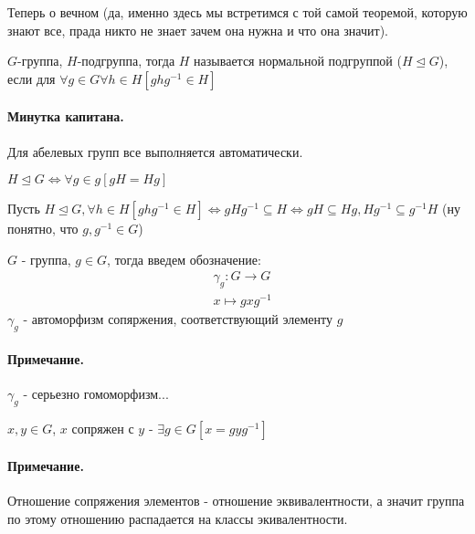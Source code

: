 Теперь о вечном (да, именно здесь мы встретимся с той самой теоремой, которую знают все, прада никто не знает зачем она нужна и что она значит).

\begin{Def}
$G$-группа, $H$-подгруппа, тогда $H$ называется нормальной подгруппой ($H \trianglelefteq G$), если для $\forall g \in G \forall h \in H \left[g h g^{-1} \in H \right]$
\end{Def}

\paragraph{Минутка капитана.} Для абелевых групп все выполняется автоматически.

\begin{Th}
$H \trianglelefteq G \Leftrightarrow \forall g \in g \left[gH = Hg\right]$
\end{Th}
\begin{Proof}
Пусть $H \trianglelefteq G, \forall h \in H \left[ghg^{-1}\in H\right] \Leftrightarrow gHg^{-1} \subseteq H \Leftrightarrow gH \subseteq Hg, Hg^{-1} \subseteq g^{-1}H$ (ну понятно, что $g, g^{-1} \in G$)
\end{Proof}

\begin{Def}
$G$ - группа, $g \in G$, тогда введем обозначение:
\[
\begin{split}
	& \gamma_g : G \rightarrow G \\
	& x \mapsto gxg^{-1}
\end{split}
\]
$\gamma_g$ - автоморфизм сопяржения, соответствующий элементу $g$
\end{Def}

\paragraph{Примечание.} $\gamma_g$ - серьезно гомоморфизм...

\begin{Def}
$x,y \in G$, $x$ сопряжен с $y$ - $\exists g \in G \left[x = gyg^{-1}\right]$
\end{Def}

\paragraph{Примечание.} Отношение сопряжения элементов - отношение эквивалентности, а значит группа по этому отношению распадается на классы экивалентности.

